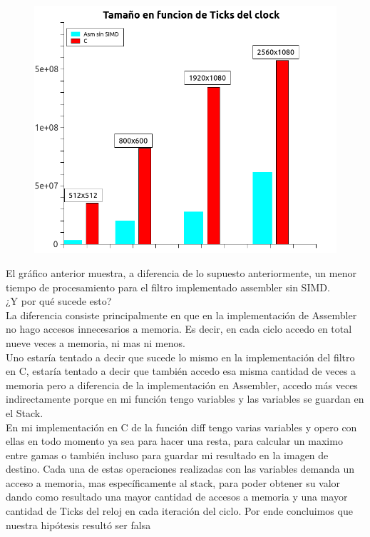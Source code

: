  \begin{figure}[H]
\begin{center}
  \includegraphics[width=\linewidth]{diffsinsimd/ASMssdC.png}
\end{center}
\end{figure}
El gráfico anterior muestra, a diferencia de lo supuesto anteriormente, un menor tiempo de procesamiento para el filtro implementado assembler sin SIMD.\\
¿Y por qué sucede esto?\\
La diferencia consiste principalmente en que en la implementación de Assembler no hago accesos innecesarios a memoria. Es decir, en cada ciclo accedo en total nueve veces a memoria, ni mas ni menos.\\
 Uno estaría tentado a decir que sucede lo mismo en la implementación del filtro en C, estaría tentado a decir que también accedo esa misma cantidad de veces a memoria pero a diferencia de la implementación en Assembler, accedo más veces indirectamente porque en mi función tengo variables y las variables se guardan en el Stack.\\
 En mi implementación en C de la función diff tengo varias variables y opero con ellas en todo momento ya sea para hacer una resta, para calcular un maximo entre gamas o también incluso para guardar mi resultado en la imagen de destino. Cada una de estas operaciones realizadas con las variables demanda un acceso a memoria, mas específicamente al stack, para poder obtener su valor dando como resultado una mayor cantidad de accesos a memoria y una mayor cantidad de Ticks del reloj en cada iteración del ciclo. Por ende concluimos que nuestra hipótesis resultó ser falsa\\
 

  
 





